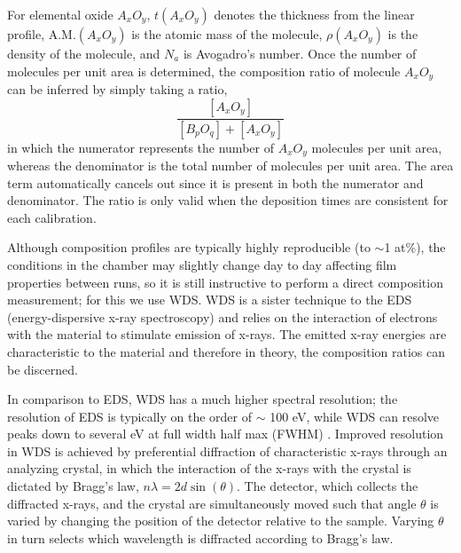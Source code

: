 For elemental oxide $A_{x}O_{y}$,  $t(A_{x}O_{y})$ denotes the thickness from the linear profile, $\text{A.M.}(A_{x}O_{y})$ is the atomic mass of the molecule, $\rho (A_{x}O_{y})$ is the density of the molecule, and $N_{a}$ is Avogadro's number. Once the number of molecules per unit area is determined, the composition ratio of molecule $A_{x}O_{y}$ can be inferred by simply taking a ratio,
\begin{equation}\label{eq:composition_b}
\frac{[A_{x}O_{y}]}{[B_{p}O_{q}]+[A_{x}O_{y}]}
\end{equation}
in which the numerator represents the number of $A_{x}O_{y}$ molecules per unit area, whereas the denominator is the total number of molecules per unit area. The area term automatically cancels out since it is present in both the numerator and denominator. The ratio is only valid when the deposition times are consistent for each calibration.

Although composition profiles are typically highly reproducible (to $\sim$1 at\%), the conditions in the chamber may slightly change day to day affecting film properties between runs, so it is still instructive to perform a direct composition measurement; for this we use WDS. WDS is a sister technique to the EDS (energy-dispersive x-ray spectroscopy) and relies on the interaction of electrons with the material to stimulate emission of x-rays. The emitted x-ray energies are characteristic to the material and therefore in theory, the composition ratios can be discerned.

In comparison to EDS, WDS has a much higher spectral resolution; the resolution of EDS is typically on the order of $\sim$ 100 eV, while WDS can resolve peaks down to several eV at full width half max (FWHM) \cite{Goldstein2003}. Improved resolution in WDS is achieved by preferential diffraction of characteristic x-rays through an analyzing crystal, in which the interaction of the x-rays with the crystal is dictated by Bragg's law, $n\lambda = 2d\sin(\theta)$. The detector, which collects the diffracted x-rays, and the crystal are simultaneously moved such that angle $\theta$ is varied by changing the position of the detector relative to the sample. Varying $\theta$ in turn selects which wavelength is diffracted according to Bragg's law. 

